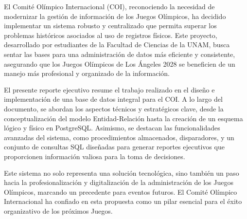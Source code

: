 El Comité Olímpico Internacional (COI), reconociendo la necesidad de modernizar la gestión de información de los Juegos Olímpicos, ha decidido implementar un sistema robusto y centralizado que permita superar los problemas históricos asociados al uso de registros físicos. Este proyecto, desarrollado por estudiantes de la Facultad de Ciencias de la UNAM, busca sentar las bases para una administración de datos más eficiente y consistente, asegurando que los Juegos Olímpicos de Los Ángeles 2028 se beneficien de un manejo más profesional y organizado de la información. \vspace{0.5cm}

    El presente reporte ejecutivo resume el trabajo realizado en el diseño e implementación de una base de datos integral para el COI. A lo largo del documento, se abordan los aspectos técnicos y estratégicos clave, desde la conceptualización del modelo Entidad-Relación hasta la creación de un esquema lógico y físico en PostgreSQL. Asimismo, se destacan las funcionalidades avanzadas del sistema, como procedimientos almacenados, disparadores, y un conjunto de consultas SQL diseñadas para generar reportes ejecutivos que proporcionen información valiosa para la toma de decisiones.\vspace{0.5cm}

    Este sistema no solo representa una solución tecnológica, sino también un paso hacia la profesionalización y digitalización de la administración de los Juegos Olímpicos, marcando un precedente para eventos futuros. El Comité Olímpico Internacional ha confiado en esta propuesta como un pilar esencial para el éxito organizativo de los próximos Juegos.\vspace{0.5cm}